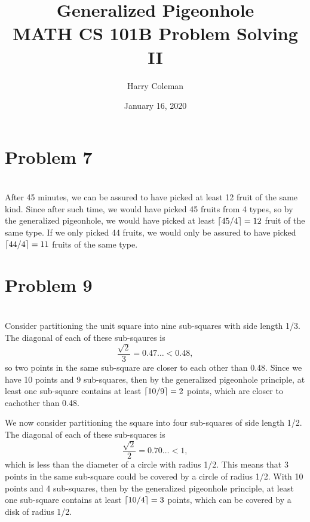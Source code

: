 \documentclass[12pt]{article}
\DeclarePairedDelimiter{\ceil}{\lceil}{\rceil}
\begin{document}
 
\title{Generalized Pigeonhole\\
    \large MATH CS 101B Problem Solving II}
\author{Harry Coleman}
\date{January 16, 2020}

\maketitle

\section*{Problem 7}
\\

After 45 minutes, we can be assured to have picked at least 12 fruit of the same kind. Since after such time, we would have picked 45 fruits from 4 types, so by the generalized pigeonhole, we would have picked at least $\ceil{45/4}=12$ fruit of the same type. If we only picked 44 fruits, we would only be assured to have picked $\ceil{44/4}=11$ fruits of the same type.


\section*{Problem 9 }
\\

Consider partitioning the unit square into nine sub-squares with side length 1/3. The diagonal of each of these sub-sqaures is
\[\frac{\sqrt{2}}{3} = 0.47\dots < 0.48,\]
so two points in the same sub-square are closer to each other than 0.48. Since we have 10 points and 9 sub-squares, then by the generalized pigeonhole principle, at least one sub-square contains at least $\ceil{10/9}=2$ points, which are closer to eachother than 0.48.

We now consider partitioning the square into four sub-squares of side length 1/2. The diagonal of each of these sub-squares is
\[\frac{\sqrt{2}}{2} = 0.70\dots<1,\]
which is less than the diameter of a circle with radius 1/2. This means that 3 points in the same sub-square could be covered by a circle of radius 1/2. With 10 points and 4 sub-squares, then by the generalized pigeonhole principle, at least one sub-square contains at least $\ceil{10/4}=3$ points, which can be covered by a disk of radius 1/2. 
\end{document}
